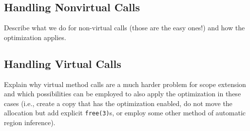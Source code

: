 		\subsection{Handling Nonvirtual Calls}
			\label{sub:scopeext:analysis:nonvirtual}
			Describe what we do for non-virtual calls (those are the easy ones!) and how the optimization applies.

		\subsection{Handling Virtual Calls}
			\label{sub:scopeext:analysis:virtual}
			Explain why virtual method calls are a much harder problem for scope extension and which possibilities can be
			employed to also apply the optimization in these cases (i.e., create a copy that has the optimization enabled, do
			not move the allocation but add explicit \texttt{free(3)}s, or employ some other method of automatic region
			inference).
